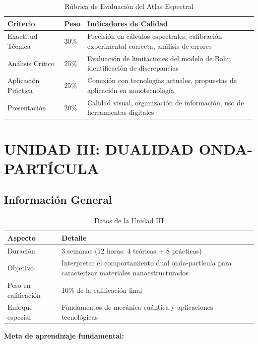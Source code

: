 \begin{tecnologiabox}
\begin{tecnologiabox}
\begin{tecnologiabox}
\begin{teknologiabox}
\begin{table}[h]
\centering
\caption{Rúbrica de Evaluación del Atlas Espectral}
\begin{tabular}{|L{3cm}|C{1.5cm}|L{7.5cm}|}
\hline
{}
\textbf{Criterio} & \textbf{Peso} & \textbf{Indicadores de Calidad} \\
\hline
Exactitud Técnica & 30\% & Precisión en cálculos espectrales, calibración experimental correcta, análisis de errores \\
\hline
Análisis Crítico & 25\% & Evaluación de limitaciones del modelo de Bohr, identificación de discrepancias \\
\hline
Aplicación Práctica & 25\% & Conexión con tecnologías actuales, propuestas de aplicación en nanotecnología \\
\hline
Presentación & 20\% & Calidad visual, organización de información, uso de herramientas digitales \\
\hline
\end{tabular}
\end{table}

\chapter{UNIDAD III: DUALIDAD ONDA-PARTÍCULA}

\section{Información General}

\begin{table}[h]
\centering
\caption{Datos de la Unidad III}
\begin{tabular}{|L{4cm}|L{8cm}|}
\hline
{}
\textbf{Aspecto} & \textbf{Detalle} \\
\hline
Duración & 3 semanas (12 horas: 4 teóricas + 8 prácticas) \\
\hline
Objetivo & Interpretar el comportamiento dual onda-partícula para caracterizar materiales nanoestructurados \\
\hline
Peso en calificación & 10\% de la calificación final \\
\hline
Enfoque especial & Fundamentos de mecánica cuántica y aplicaciones tecnológicas \\
\hline
\end{tabular}
\end{table}

\begin{objetivobox}
\textbf{Meta de aprendizaje fundamental:}


\end{objetivobox}
\end{teknologiabox}
\end{tecnologiabox}
\end{tecnologiabox}
\end{tecnologiabox}
